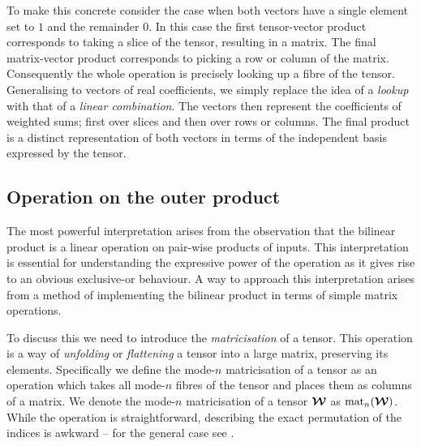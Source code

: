 To make this concrete
consider the case when both vectors have a single element set to \(1\) and the remainder
\(0\). In this case the first tensor-vector product corresponds to taking a slice of the
tensor, resulting in a matrix. The final matrix-vector product corresponds to picking a
row or column of the matrix. Consequently the whole operation is precisely looking up
a fibre of the tensor. Generalising to vectors of real coefficients, we simply replace the idea of a
\emph{lookup} with that of a \emph{linear combination}. The vectors then represent the coefficients
of weighted sums; first over slices and then over rows or columns. The final product is a
distinct representation of both vectors in terms of the independent basis expressed by the tensor.

\subsection{Operation on the outer product}
The most powerful interpretation arises from the observation that the bilinear product is
a linear operation on pair-wise products of inputs.
This interpretation is essential for understanding the expressive
power of the operation as it gives rise to an obvious exclusive-or behaviour.
A way to approach this interpretation arises from a method of implementing the bilinear 
product in terms of simple matrix operations.

To discuss
this we need to introduce the \emph{matricisation} of a tensor. This
operation is a way of \emph{unfolding} or \emph{flattening} a tensor into a large matrix,
preserving its elements. Specifically we define the mode-\(n\)
matricisation of a tensor as an operation which takes all mode-\(n\) fibres
of the tensor and places them as columns of a matrix. We denote the mode-\(n\)
matricisation of a tensor \(\bm{\mathcal{W}}\) as \(\operatorname{mat}_n(\bm{\mathcal{W}})\). While the operation is
straightforward, describing the exact permutation of the indices is awkward -- 
for the general case see
\autocite{Kolda2009}. 

